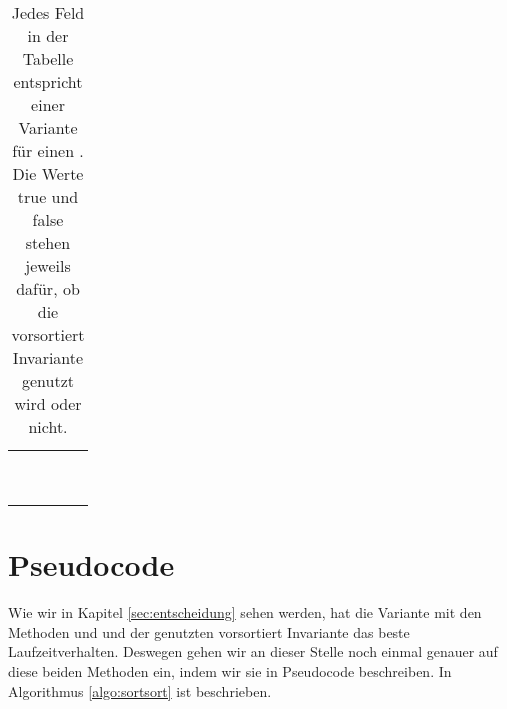 \begin{table}
	\centering
	\begin{tabular}{c||c|c||c|c}
		 & \multicolumn{2}{c||}{\distr} & \multicolumn{2}{c}{\perm} \\
		 & \true & \false & \true & \false
		\\ \hline\hline
		\SorSor & & & & \\ \hline\hline
		\SeaSor & & & &\\ \hline\hline
		\SorSea & & & &\\ \hline\hline
		\SeaSet & & & &\\ \hline\hline
		\SetSea & & & &\\ \hline\hline
		\SeaUSet & & & &\\ \hline\hline
		\USetSea& & & &
	\end{tabular}
	\caption{Jedes Feld in der Tabelle entspricht einer Variante für einen \ct{}. Die Werte true 
	und false stehen jeweils dafür, ob die vorsortiert Invariante genutzt wird oder nicht.}
	\label{tab:varianten}
\end{table}





\section{Pseudocode}
Wie wir in Kapitel \ref{sec:entscheidung} sehen werden, 
hat die Variante mit den Methoden \SorSor{} und \distr{} und der genutzten vorsortiert
Invariante das beste Laufzeitverhalten. Deswegen gehen wir an dieser Stelle 
noch einmal genauer auf diese beiden Methoden ein, indem wir sie in Pseudocode
beschreiben. In Algorithmus \ref{algo:sortsort} ist \SorSor{} beschrieben.

